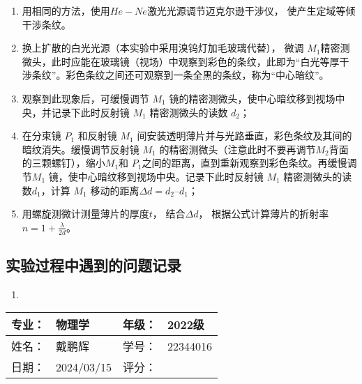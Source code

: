 \documentclass[dvipsnames, svgnames,a4paper,11pt]{article}
\begin{document}
		\begin{enumerate}
			\item 用相同的方法，使用$He-Ne$激光光源调节迈克尔逊干涉仪， 使产生定域等倾干涉条纹。
			
			\item 换上扩散的白光光源（本实验中采用溴钨灯加毛玻璃代替）， 微调 $M_1$精密测微头，此时应能在玻璃镜（视场）中观察到彩色的条纹，此即为“白光等厚干涉条纹”。彩色条纹之间还可观察到一条全黑的条纹，称为“中心暗纹”。
			
			\item 观察到此现象后，可缓慢调节 $M_1$ 镜的精密测微头，使中心暗纹移到视场中央，并记录下此时反射镜 $M_1$ 精密测微头的读数 $d_2$；
			
			\item 在分束镜 $P_1$ 和反射镜 $M_1$ 间安装透明薄片并与光路垂直，彩色条纹及其间的暗纹消失。缓慢调节反射镜 $M_1$ 的精密测微头（注意此时不要再调节$M_2$背面的三颗螺钉），缩小$ M_1 $和 $P_1$之间的距离，直到重新观察到彩色条纹。再缓慢调节$ M_1$ 镜，使中心暗纹移到视场中央。记录下此时反射镜 $M_1$ 精密测微头的读数$ d_1$，计算 $M_1$ 移动的距离$\Delta d = d_2 – d_1$；
			
			\item 用螺旋测微计测量薄片的厚度$ t$， 结合$\Delta d$， 根据公式计算薄片的折射率 $n=1+\frac{\lambda}{2d}$。
		\end{enumerate}
		
		
		
		
		
		
		


\subsection{实验过程中遇到的问题记录}

\begin{enumerate}
	\item 	
	
\end{enumerate}
	

\clearpage
\begin{table}
	\renewcommand\arraystretch{1.7}
	\begin{tabularx}{\textwidth}{|X|X|X|X|}
	\hline
	专业：& 物理学 &年级：& 2022级\\
	\hline
	姓名： & 戴鹏辉 & 学号：& 22344016\\
	\hline
    日期：& 2024/03/15 & 评分： &\\
	\hline
	\end{tabularx}
\end{table}
\end{document}

